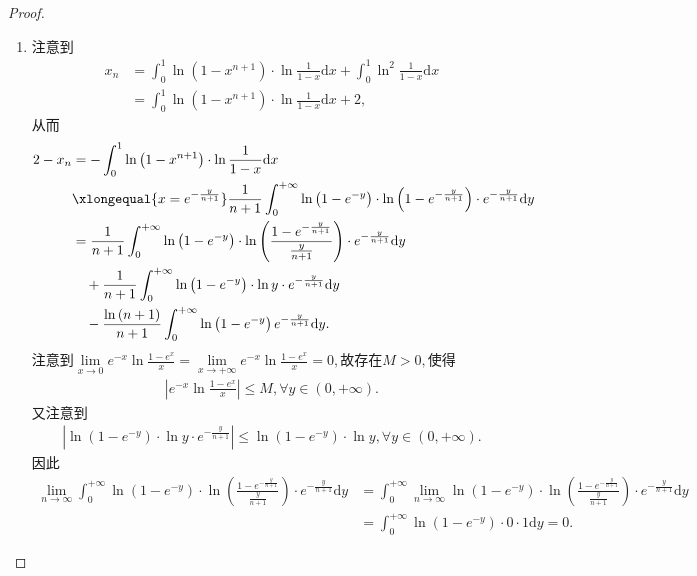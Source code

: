 \documentclass[../../main.tex]{subfiles}
\begin{document}
\begin{proof}
\begin{enumerate}[(1)]
\item 注意到
\begin{align*}
x_n&=\int_0^1 \ln \left( 1-x^{n+1} \right) \cdot \ln \frac{1}{1-x}\mathrm{d}x+\int_0^1 \ln ^2\frac{1}{1-x}\mathrm{d}x\\
&=\int_0^1 \ln \left( 1-x^{n+1} \right) \cdot \ln \frac{1}{1-x}\mathrm{d}x+2,
\end{align*}
从而
\begin{align}
2-x_n&=-\int_0^1 \ln \left( 1-x^{n+1} \right) \cdot \ln \frac{1}{1-x}\mathrm{d}x \nonumber \\
&\xlongequal{x=e^{-\frac{y}{n+1}}}\frac{1}{n+1}\int_0^{+\infty} \ln \left( 1-e^{-y} \right) \cdot \ln \left( 1-e^{-\frac{y}{n+1}} \right) \cdot e^{-\frac{y}{n+1}}\mathrm{d}y\nonumber \\
&=\frac{1}{n+1}\int_0^{+\infty} \ln \left( 1-e^{-y} \right) \cdot \ln \left( \frac{1-e^{-\frac{y}{n+1}}}{\frac{y}{n+1}} \right) \cdot e^{-\frac{y}{n+1}}\mathrm{d}y \nonumber \\
&\quad +\frac{1}{n+1}\int_0^{+\infty} \ln \left( 1-e^{-y} \right) \cdot \ln y\cdot e^{-\frac{y}{n+1}}\mathrm{d}y \nonumber \\
&\quad -\frac{\ln \left( n+1 \right)}{n+1}\int_0^{+\infty} \ln \left( 1-e^{-y} \right) e^{-\frac{y}{n+1}}\mathrm{d}y. \label{eq:123.123123123}
\end{align}
注意到$\lim\limits_{x\rightarrow 0}e^{-x}\ln \frac{1-e^x}{x}=\lim\limits_{x\rightarrow +\infty}e^{-x}\ln \frac{1-e^x}{x}=0,$故存在$M>0,$使得
\begin{align*}
\left| e^{-x}\ln \frac{1-e^x}{x} \right|\leqslant M,\forall y\in \left( 0,+\infty \right) .
\end{align*}
又注意到
\begin{align*}
\left| \ln \left( 1-e^{-y} \right) \cdot \ln y\cdot e^{-\frac{y}{n+1}} \right|\leqslant \ln \left( 1-e^{-y} \right) \cdot \ln y,\forall y\in \left( 0,+\infty \right) .
\end{align*}
因此
\begin{align*}
\lim\limits_{n\rightarrow \infty}\int_0^{+\infty} \ln \left( 1-e^{-y} \right) \cdot \ln \left( \frac{1-e^{-\frac{y}{n+1}}}{\frac{y}{n+1}} \right) \cdot e^{-\frac{y}{n+1}}\mathrm{d}y&=\int_0^{+\infty} \lim\limits_{n\rightarrow \infty}\ln \left( 1-e^{-y} \right) \cdot \ln \left( \frac{1-e^{-\frac{y}{n+1}}}{\frac{y}{n+1}} \right) \cdot e^{-\frac{y}{n+1}}\mathrm{d}y\\
&=\int_0^{+\infty} \ln \left( 1-e^{-y} \right) \cdot 0\cdot 1\mathrm{d}y=0.
\end{align*}


\end{enumerate}
\end{proof}
\end{document}
